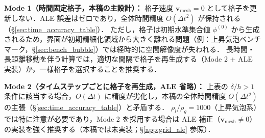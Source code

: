 \begin{tcolorbox}[mybox, title={各モードの精度と適用範囲の整理}]
\textbf{Mode 1（時間固定格子，本稿の主設計）：}
格子速度 $\bm{v}_\text{mesh} = 0$ として格子を更新しない．ALE 誤差はゼロであり，全体時間精度 $O(\Delta t^2)$ が保持される（§\ref{sec:time_accuracy_table}）．
ただし，格子は初期水準集合値 $\phi^{(0)}$ から生成されるため，界面が初期精細化領域から大きく離れる問題（例：上昇気泡ベンチマーク，§\ref{sec:bench_bubble}）では経時的に空間解像度が失われる．
長時間・長距離移動を伴う計算では，適切な間隔で格子を再生成する（Mode 2 + ALE 実装）か，一様格子を選択することを推奨する．

\textbf{Mode 2（タイムステップごとに格子を再生成，ALE 省略）：}
上表の $\delta/h > 1$ 条件に該当する場合，$O(\Delta t)$ に精度が劣化し，本稿の全体時間精度 $O(\Delta t^2)$ の主張（§\ref{sec:time_accuracy_table}）と矛盾する．
$\rho_l/\rho_g = 1000$（上昇気泡系）では特に注意が必要であり，Mode 2 を採用する場合は ALE 補正（$\bm{v}_\text{mesh} \neq 0$）の実装を強く推奨する（本稿では未実装；§\ref{app:grid_ale} 参照）．
\end{tcolorbox}

